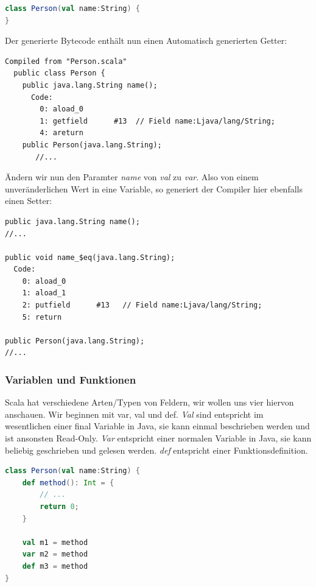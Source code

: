 \documentclass[a4paper, 11pt]{article}
\begin{document}
		\begin{lstlisting}[language=Scala]
class Person(val name:String) {
}
		\end{lstlisting}
		
		Der generierte Bytecode enthält nun einen Automatisch generierten Getter:
		
	\begin{lstlisting}[language=JVMIS]
Compiled from "Person.scala"
  public class Person {
    public java.lang.String name();
      Code:
        0: aload_0
        1: getfield      #13  // Field name:Ljava/lang/String;
        4: areturn
    public Person(java.lang.String);
       //...
	\end{lstlisting}
	
	Ändern wir nun den Paramter \textit{name} von \textit{val} zu \textit{var}. Also von einem unveränderlichen Wert in eine Variable, so generiert der Compiler hier ebenfalls einen Setter:
	
\begin{lstlisting}[language=JVMIS]
public java.lang.String name();
//...	

public void name_$eq(java.lang.String);
  Code:
    0: aload_0
    1: aload_1
    2: putfield      #13   // Field name:Ljava/lang/String;
    5: return
      
public Person(java.lang.String);
//...
	\end{lstlisting}
	
	  
	  \subsubsection{Variablen und Funktionen}
	  Scala hat verschiedene Arten/Typen von Feldern, wir wollen uns vier hiervon anschauen. Wir beginnen mit var, val und def. 
	  \textit{Val} sind entspricht im wesentlichen einer final Variable in Java, sie kann einmal beschrieben werden und ist ansonsten Read-Only. 
	  \textit{Var} entspricht einer normalen Variable in Java, sie kann beliebig geschrieben und gelesen werden.
	  \textit{def} entspricht einer Funktionsdefinition. 
	  
	  \begin{lstlisting}[language=Scala]
class Person(val name:String) {
	def method(): Int = {
		// ...
		return 0;
	}
 
	val m1 = method
	var m2 = method
	def m3 = method
}	  
	  \end{lstlisting}
	  
\end{document}
